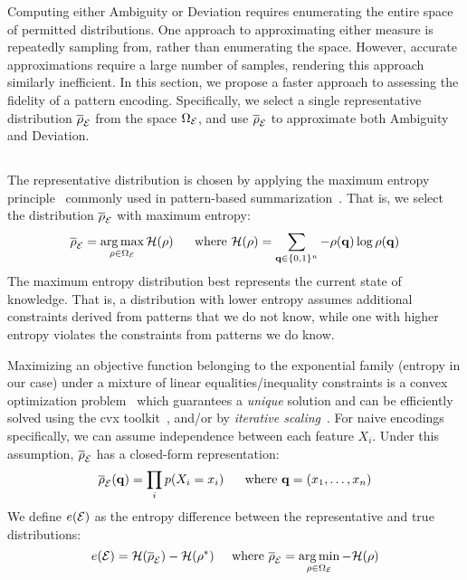 Computing either Ambiguity or Deviation requires enumerating the entire space of permitted distributions.
One approach to approximating either measure is repeatedly sampling from, rather than enumerating the space.  
However, accurate approximations require a large number of samples, rendering this approach similarly inefficient.
In this section, we propose a faster approach to assessing the fidelity of a pattern encoding.
Specifically, we select a single representative distribution $\overline \rho_\mathcal E$ from the space $\Omega_\mathcal E$, and use $\overline \rho_\mathcal E$ to approximate both Ambiguity and Deviation.


\subsection{\Errorname}
\label{sec:maximumentropydistribution}

The representative distribution is chosen by applying the maximum entropy principle~\cite{DBLP:journals/tssc/Jaynes68} commonly used in pattern-based summarization~\cite{DBLP:journals/tkdd/MampaeyVT12,DBLP:journals/pvldb/GebalyAGKS14}.
That is, we select the distribution $\overline{\rho}_\mathcal E$ with maximum entropy:
$$\overline{\rho}_\mathcal E=\operatorname*{arg\,max}\limits_{\rho\in\Omega_\mathcal E}\mathcal{H}(\rho)\;\;\;\;\;\;\text{where }\mathcal{H}(\rho)=\operatorname*{\sum}\limits_{\mathbf{q}\in\{0,1\}^n}-\rho(\mathbf{q})\log \rho(\mathbf{q})$$
The maximum entropy distribution best represents the current state of knowledge.
That is, a distribution with lower entropy assumes additional constraints derived from patterns that we do not know, while one with higher entropy violates the constraints from patterns we do know.

Maximizing an objective function belonging to the exponential family (entropy in our case) under a mixture of linear equalities/inequality constraints is a convex optimization problem~\cite{Boyd:2004:CO:993483} which guarantees a \emph{unique} solution and can be efficiently solved using the cvx toolkit~\cite{cvx,DBLP:journals/jota/ODonoghueCPB16}, and/or by \textit{iterative scaling}~\cite{DBLP:journals/tkdd/MampaeyVT12,DBLP:journals/pvldb/GebalyAGKS14}.
For naive encodings specifically, we can assume independence between each feature $X_i$.  
Under this assumption, $\overline{\rho}_\mathcal E$ has a closed-form representation:
\begin{equation*}
\overline{\rho}_\mathcal E(\mathbf{q})=\prod_{i}p(X_i=x_i)\;\;\;\;\;\;\text{where } \mathbf{q}=(x_1,\ldots,x_n)
\end{equation*} 
%
We define \textit{\errorname} $e(\mathcal E)$ as the entropy difference between the representative and true distributions:
$$e(\mathcal E)=\mathcal{H}(\overline{\rho}_\mathcal E)-\mathcal{H}(\rho^*)\;\;\;\;\;\text{where }\overline{\rho}_\mathcal E=\operatorname*{arg\,min}\limits_{\rho\in\Omega_\mathcal E}-\mathcal{H}(\rho)$$


